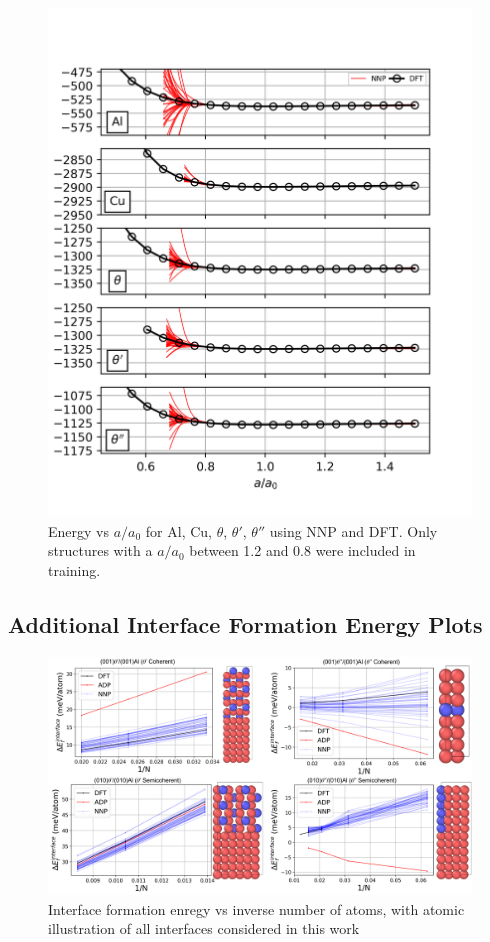 \documentclass{article}
\begin{document}
\begin{figure}[H]%
\centering%
\includegraphics[width=1.0\textwidth,center]{figures/EOS_all.png}%
\caption{Energy vs $a/a_0$ for Al, Cu, $\theta$, $\theta'$, $\theta''$ using NNP and DFT. Only structures with a $a/a_0$ between 1.2 and 0.8 were included in training.}%
\end{figure}


\begin{landscape}
\subsection{Additional Interface Formation Energy Plots} \label{apd_sct:add_interface}

\begin{figure}[H]%
\centering%
\includegraphics[width=1.4\textwidth,center]{figures/InterfaceAll.png}%
\caption{Interface formation enregy vs inverse number of atoms, with atomic illustration of all interfaces considered in this work}%
\label{fig:interface_structures}
\end{figure}
\end{landscape}
\end{document}
